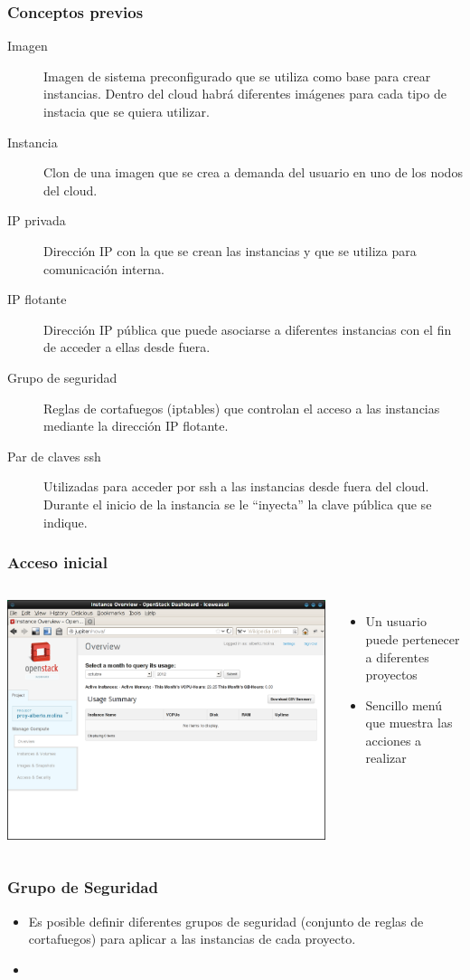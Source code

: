 \documentclass{beamer}
\begin{document}
\begin{frame}
  \frametitle{Conceptos previos}
  \begin{description}
  \item[Imagen] Imagen de sistema preconfigurado que se utiliza como base para crear instancias. Dentro del cloud habrá diferentes imágenes para cada tipo de instacia que se quiera utilizar.
  \item[Instancia] Clon de una imagen que se crea a demanda del usuario en uno de los nodos del cloud. 
  \item[IP privada] Dirección IP con la que se crean las instancias y que se utiliza para comunicación interna.
  \item[IP flotante] Dirección IP pública que puede asociarse a diferentes instancias con el fin de acceder a ellas desde fuera.
  \item [Grupo de seguridad] Reglas de cortafuegos (iptables) que controlan el acceso a las instancias mediante la dirección IP flotante. 
  \item[Par de claves ssh] Utilizadas para acceder por ssh a las instancias desde fuera del cloud. Durante el inicio de la instancia se le ``inyecta'' la clave pública que se indique.
  \end{description}
\end{frame}

\begin{frame}
  \frametitle{Acceso inicial}
  \begin{columns}
    \includegraphics[width=\columnwidth]{../img/horizon2.png}    
    \begin{itemize}
    \item Un usuario puede pertenecer a diferentes proyectos
    \item Sencillo menú que muestra las acciones a realizar
    \end{itemize}
  \end{columns}
\end{frame}

\begin{frame}
  \frametitle{Grupo de Seguridad}
  \begin{itemize}
  \item Es posible definir diferentes grupos de seguridad (conjunto de reglas de cortafuegos) para aplicar a las instancias de cada proyecto.
  \item 
  \end{itemize}
\end{frame}
\end{document}
